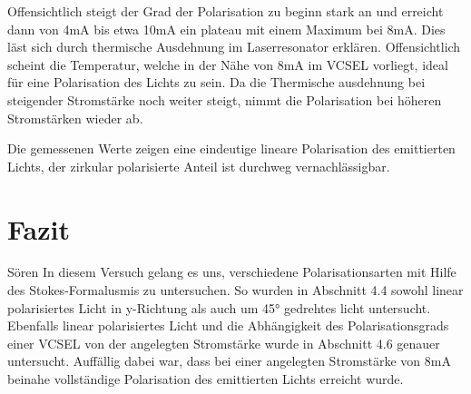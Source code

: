 \documentclass[bigchapter,colorback,accentcolor=tud4b,linedtoc,11pt]{tudreport}
\begin{document}
Offensichtlich steigt der Grad der Polarisation zu beginn stark an und erreicht dann von 4mA bis etwa 10mA ein plateau mit einem Maximum bei 8mA. Dies läst sich durch thermische Ausdehnung im Laserresonator erklären. Offensichtlich scheint die Temperatur, welche in der Nähe von 8mA im VCSEL vorliegt, ideal für eine Polarisation des Lichts zu sein. Da die Thermische ausdehnung bei steigender Stromstärke noch weiter steigt, nimmt die Polarisation bei höheren Stromstärken wieder ab.

Die gemessenen Werte zeigen eine eindeutige lineare Polarisation des emittierten Lichts, der zirkular polarisierte Anteil ist durchweg vernachlässigbar.
\begin{center}
\begin{figure}[h]
\end{figure}
\end{center}

\chapter{Fazit}
Sören
In diesem Versuch gelang es uns, verschiedene Polarisationsarten mit Hilfe des Stokes-Formalusmis zu untersuchen. So wurden in Abschnitt 4.4 sowohl linear polarisiertes Licht in y-Richtung als auch um 45° gedrehtes licht untersucht. Ebenfalls linear polarisiertes Licht und die Abhängigkeit des Polarisationsgrads einer VCSEL von der angelegten Stromstärke wurde in Abschnitt 4.6 genauer untersucht. Auffällig dabei war, dass bei einer angelegten Stromstärke von 8mA beinahe vollständige Polarisation des emittierten Lichts erreicht wurde.
\end{document}
